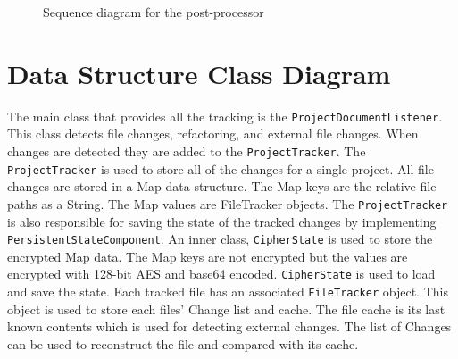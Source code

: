 \vspace*{\fill}

\begin{figure}[H]
  \centering
  \caption[Post-processor sequence diagram]{Sequence diagram for the post-processor}
  \label{fig:sequence-diagram-post-processor}
\end{figure}

\vspace*{\fill}

\newpage

\section{Data Structure Class Diagram}
The main class that provides all the tracking is the \texttt{ProjectDocumentListener}. This class detects file changes, refactoring, and external file changes. When changes are detected they are added to the \texttt{ProjectTracker}. The \texttt{ProjectTracker} is used to store all of the changes for a single project. All file changes are stored in a Map data structure. The Map keys are the relative file paths as a String. The Map values are FileTracker objects. The \texttt{ProjectTracker} is also responsible for saving the state of the tracked changes by implementing \texttt{PersistentStateComponent}. An inner class, \texttt{CipherState} is used to store the encrypted Map data. The Map keys are not encrypted but the values are encrypted with 128-bit AES and base64 encoded. \texttt{CipherState} is used to load and save the state. Each tracked file has an associated \texttt{FileTracker} object. This object is used to store each files' Change list and cache. The file cache is its last known contents which is used for detecting external changes. The list of Changes can be used to reconstruct the file and compared with its cache.

